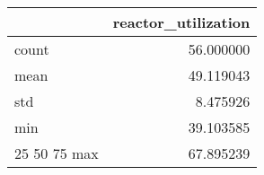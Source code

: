 \begin{tabular}{lr}
\toprule
 & reactor\_utilization \\
\midrule
count & 56.000000 \\
mean & 49.119043 \\
std & 8.475926 \\
min & 39.103585 \\
25%
50%
75%
max & 67.895239 \\
\bottomrule
\end{tabular}


